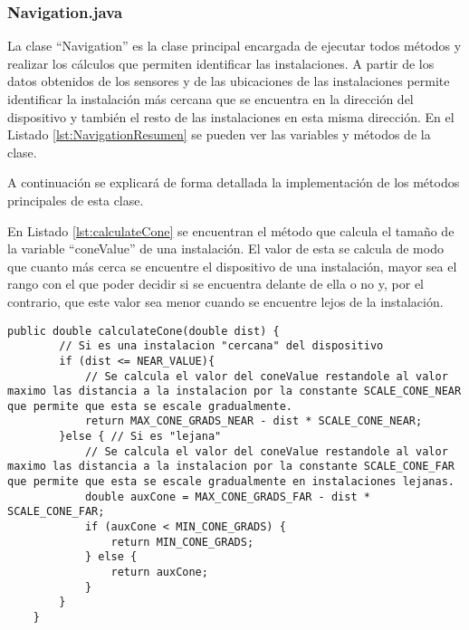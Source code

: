  
\subsubsection{Navigation.java}

La clase ``Navigation'' es la clase principal encargada de  ejecutar todos métodos y realizar  los cálculos que permiten identificar las instalaciones. A partir de los datos obtenidos de los sensores y de las ubicaciones de las instalaciones permite identificar la instalación más cercana que se encuentra en la dirección del dispositivo y también el resto de las instalaciones en esta misma dirección. En el Listado \ref{lst:NavigationResumen} se pueden ver las variables y métodos de la clase.

\bigskip



A continuación se explicará de forma detallada la implementación de los métodos principales de esta clase.

En Listado \ref{lst:calculateCone} se encuentran el método que calcula el tamaño de la variable ``coneValue'' de una instalación. El valor de esta se calcula de modo que cuanto más cerca se encuentre el dispositivo de una instalación, mayor sea el rango con el que poder decidir si se encuentra delante de ella o no y, por el contrario, que este valor sea menor cuando se encuentre lejos de la instalación.
\bigskip

\bigskip

\bigskip
\begin{lstlisting}[caption={Código para calcular el \textit{coneValue} de identificación de cada instalación.}, label={lst:calculateCone}]
    public double calculateCone(double dist) {
        // Si es una instalacion "cercana" del dispositivo
        if (dist <= NEAR_VALUE){
            // Se calcula el valor del coneValue restandole al valor maximo las distancia a la instalacion por la constante SCALE_CONE_NEAR que permite que esta se escale gradualmente.
            return MAX_CONE_GRADS_NEAR - dist * SCALE_CONE_NEAR;
        }else { // Si es "lejana"
            // Se calcula el valor del coneValue restandole al valor maximo las distancia a la instalacion por la constante SCALE_CONE_FAR que permite que esta se escale gradualmente en instalaciones lejanas.
            double auxCone = MAX_CONE_GRADS_FAR - dist * SCALE_CONE_FAR;
            if (auxCone < MIN_CONE_GRADS) {
                return MIN_CONE_GRADS;
            } else {
                return auxCone;
            }
        }
    }
\end{lstlisting}

